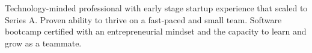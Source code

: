 
{
\color{darkgray}
Technology-minded professional with early stage startup experience that scaled to Series A. Proven ability to thrive on a fast-paced and small team. Software bootcamp certified with an entrepreneurial mindset and the capacity to learn and grow as a teammate.
}